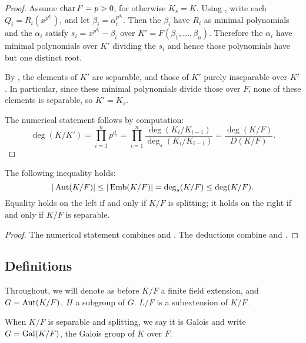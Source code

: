 \begin{proof} Assume $\operatorname{\text{char}}{F} = p > 0$, for otherwise $K_s = K$.  Using
, write each $Q_i = R_i(x^{p^{d_i}})$, and let $\beta_i =
\alpha_i^{p^{d_i}}$.  Then the $\beta_i$ have $R_i$ as minimal polynomials and
the $\alpha_i$ satisfy $s_i = x^{p^{d_i}} - \beta_i$ over $K' = F(\beta_1,
\dots, \beta_n)$.  Therefore the $\alpha_i$ have minimal polynomials over $K'$
dividing the $s_i$ and hence those polynomials have but one distinct root.

By , the elements of $K'$ are separable, and those of
$K'$ purely inseparable over $K'$.  In particular, since these minimal
polynomials divide those over $F$, none of these elements is separable, so $K'
= K_s$.

The numerical statement follows by computation:
\begin{equation*}
\deg(K/K') = \prod_{i = 1}^n p^{d_i}
	= \prod_{i = 1}^n \frac{\deg(K_i/K_{i - 1})}{\deg_s(K_i/K_{i - 1})}
	= \frac{\deg(K/F)}{D(K/F)}. 
	\end{equation*}
\end{proof}

\begin{theorem} The following inequality holds:
\begin{equation*}
|\operatorname{\text{Aut}}(K/F)| \leq |\operatorname{\text{Emb}}(K/F)| = \deg_s(K/F) \leq \deg(K/F).
\end{equation*}
Equality holds on the left if and only if $K/F$ is splitting; it holds on the
right if and only if $K/F$ is separable.
\label{galois_size}
\end{theorem}

\begin{proof} The numerical statement combines  and
.  The deductions combine  and
. \end{proof}

\subsection{Definitions}

Throughout, we will denote as before $K/F$ a finite field extension, and $G =
\operatorname{\text{Aut}}(K/F)$, $H$ a subgroup of $G$.  $L/F$ is a subextension of $K/F$.

\begin{definition} When $K/F$ is separable and splitting, we say it is Galois and
write $G = \operatorname{\text{Gal}}(K/F)$, the Galois group of $K$ over $F$.
\label{defn:galois_extension}
\end{definition}

